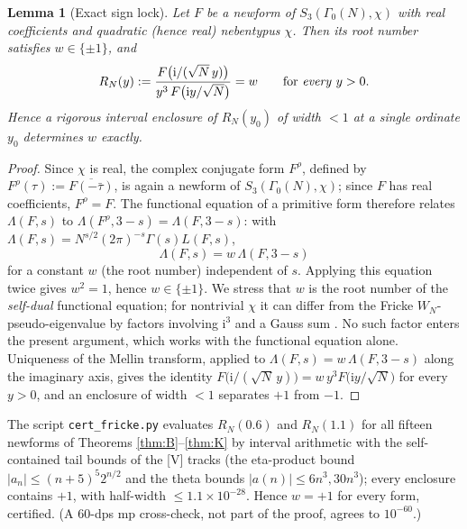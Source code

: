 \documentclass[11pt]{article}
\newcommand{\ii}{\mathrm{i}}
\newtheorem{lemma}[theorem]{Lemma}
\theoremstyle{definition}
\theoremstyle{remark}
\begin{document}
\begin{lemma}[Exact sign lock]\label{lem:signlock}
Let $F$ be a newform of $S_3(\Gamma_0(N),\chi)$ with real
coefficients and quadratic \textup{(}hence real\textup{)}
nebentypus $\chi$. Then its root number satisfies $w\in\{\pm1\}$, and
\[
  R_N(y):=\frac{F\bigl(\ii/(\sqrt N\,y)\bigr)}
               {y^3\,F\bigl(\ii y/\sqrt N\bigr)}=w
  \qquad\text{for \emph{every} }y>0.
\]
Hence a rigorous interval enclosure of $R_N(y_0)$ of width $<1$ at a
single ordinate $y_0$ determines $w$ exactly.
\end{lemma}
\begin{proof}
Since $\chi$ is real, the complex conjugate form
$F^\rho$, defined by $F^\rho(\tau):=\overline{F(-\bar\tau)}$, is
again a newform of $S_3(\Gamma_0(N),\chi)$; since $F$ has real
coefficients, $F^\rho=F$. The functional equation of a primitive form
\cite[\S4.3]{Miyake} therefore relates $\Lambda(F,s)$ to
$\Lambda(F^\rho,3-s)=\Lambda(F,3-s)$: with
$\Lambda(F,s)=N^{s/2}(2\pi)^{-s}\Gamma(s)L(F,s)$,
\[
  \Lambda(F,s)=w\,\Lambda(F,3-s)
\]
for a constant $w$ (the root number) independent of $s$. Applying
this equation twice gives $w^2=1$, hence $w\in\{\pm1\}$. We stress
that $w$ is the root number of the \emph{self-dual} functional
equation; for nontrivial $\chi$ it can differ from the Fricke
$W_N$-pseudo-eigenvalue by factors involving $\ii^3$ and a Gauss
sum \cite{AL}. No such factor enters the present argument, which
works with the functional equation alone. Uniqueness of the Mellin
transform, applied to $\Lambda(F,s)=w\,\Lambda(F,3-s)$ along the
imaginary axis, gives the identity
$F\bigl(\ii/(\sqrt N\,y)\bigr)=w\,y^3F\bigl(\ii y/\sqrt N\bigr)$
for every $y>0$, and an enclosure of width $<1$ separates $+1$
from $-1$.
\end{proof}

The script \texttt{cert\_fricke.py} evaluates $R_N(0.6)$ and
$R_N(1.1)$ for all fifteen newforms of Theorems
\ref{thm:B}--\ref{thm:K} by interval arithmetic with the
self-contained tail bounds of the [V] tracks (the eta-product bound
$|a_n|\le(n+5)^5 2^{n/2}$ and the theta bounds $|a(n)|\le 6n^3, 30n^3$);
every enclosure contains $+1$, with half-width
$\le1.1\times10^{-28}$. Hence $w=+1$ for every form, certified. (A
$60$-dps mp cross-check, not part of the proof, agrees to
$10^{-60}$.)
\end{document}
